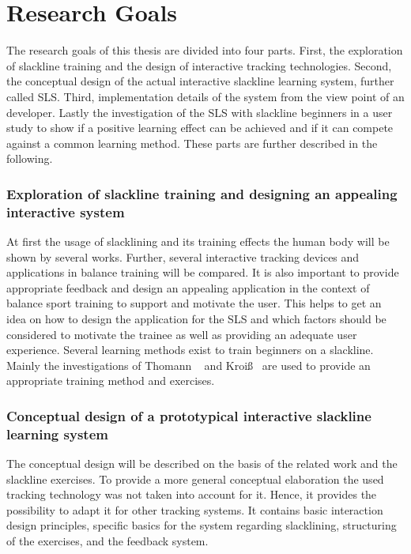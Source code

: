 \section{Research Goals}\label{1_2_researchGoals}
The research goals of this thesis are divided into four parts. 
First, the exploration of slackline training and the design of interactive tracking technologies.
Second, the conceptual design of the actual interactive slackline learning system, further called SLS.
Third, implementation details of the system from the view point of an developer.
Lastly the investigation of the SLS with slackline beginners in a user study to show if a positive learning effect can be achieved and if it can compete against a common learning method.
These parts are further described in the following.

\subsubsection{Exploration of slackline training and designing an appealing interactive system}
At first the usage of slacklining and its training effects the human body will be shown by several works.
Further, several interactive tracking devices and applications in balance training will be compared.
It is also important to provide appropriate feedback and design an appealing application in the context of balance sport training to support and motivate the user.
This helps to get an idea on how to design the application for the SLS and which factors should be considered to motivate the trainee as well as providing an adequate user experience.
Several learning methods exist to train beginners on a slackline.
Mainly the investigations of Thomann ~\cite{Thomann2013-aa} and Kroiß~\cite{Kroiss2007-ab} are used to provide an appropriate training method and exercises. 

\subsubsection{Conceptual design of a prototypical interactive slackline learning system}
The conceptual design will be described on the basis of the related work and the slackline exercises.
To provide a more general conceptual elaboration the used tracking technology was not taken into account for it.
Hence, it provides the possibility to adapt it for other tracking systems.
It contains basic interaction design principles, specific basics for the system regarding slacklining, structuring of the exercises, and the feedback system.

